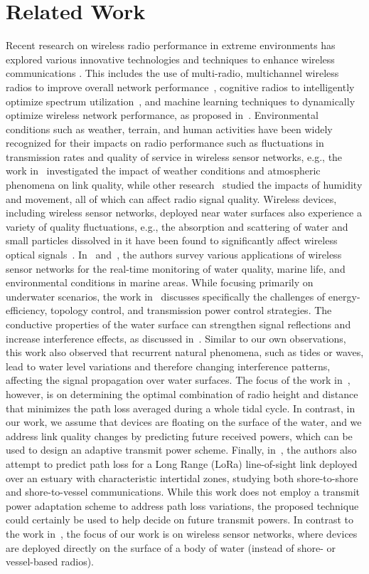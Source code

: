 \section{Related Work}
\label{sec:related}

Recent research on wireless radio performance in extreme environments has explored various innovative technologies and techniques to enhance wireless communications \cite{Renzone9361700}. This includes the use of multi-radio, multichannel wireless radios to improve overall network performance~\cite{10.1109/mascot.2009.5366718}, cognitive radios to intelligently optimize spectrum utilization~\cite{10.1155/2018/4173810}, and machine learning techniques to dynamically optimize wireless network performance, as proposed in~\cite{giordano2022design, 10.1587/comex.2018xbl0061}. Environmental conditions such as weather, terrain, and human activities have been widely recognized for their impacts on radio performance such as fluctuations in transmission rates and quality of service in wireless sensor networks, e.g., the work in~\cite{10.5194/acp-9-2413-2009} investigated the impact of weather conditions and atmospheric phenomena on link quality, while other research~\cite{10.1145/1089444.1089466} studied the impacts of humidity and movement, all of which can affect radio signal quality. Wireless devices, including wireless sensor networks, deployed near water surfaces also experience a variety of quality fluctuations, e.g., the absorption and scattering of water and small particles dissolved in it have been found to significantly affect wireless optical signals~\cite{10.18280/mmep.080316}. In~\cite{10.1016/j.jart.2017.07.004} and~\cite{10.3390/s140916932}, the authors survey various applications of wireless sensor networks for the real-time monitoring of water quality, marine life, and environmental conditions in marine areas. While focusing primarily on underwater scenarios, the work in~\cite{10.1155/2017/7539751} discusses specifically the challenges of energy-efficiency, topology control, and transmission power control strategies. The conductive properties of the water surface can strengthen signal reflections and increase interference effects, as discussed in~\cite{9706046}. Similar to our own observations, this work also observed that recurrent natural phenomena, such as tides or waves, lead to water level variations and therefore changing interference patterns, affecting the signal propagation over water surfaces. The focus of the work in~\cite{9706046}, however, is on determining the optimal combination of radio height and distance that minimizes the path loss averaged during a whole tidal cycle. In contrast, in our work, we assume that devices are floating on the surface of the water, and we address link quality changes by predicting future received powers, which can be used to design an adaptive transmit power scheme. Finally, in~\cite{9894283}, the authors also attempt to predict path loss for a Long Range (LoRa) line-of-sight link deployed over an estuary with characteristic intertidal zones, studying both shore-to-shore and shore-to-vessel communications. While this work does not employ a transmit power adaptation scheme to address path loss variations, the proposed technique could certainly be used to help decide on future transmit powers. In contrast to the work in~\cite{9894283}, the focus of our work is on wireless sensor networks, where devices are deployed directly on the surface of a body of water (instead of shore- or vessel-based radios).